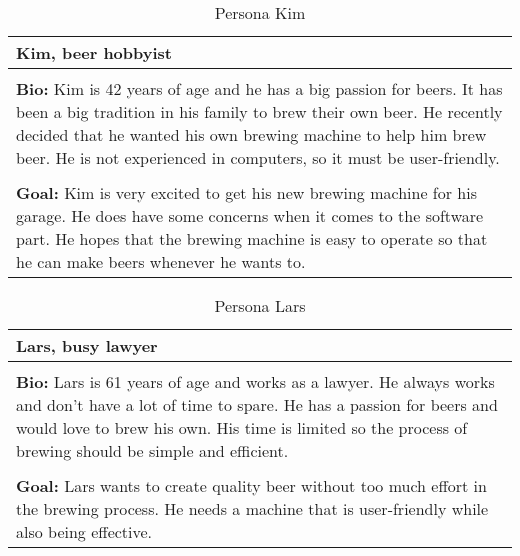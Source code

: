 \begin{table}[htb]
    \begin{center}
        \begin{tabular}{|p{16cm}|}
            \hline
            \textbf{Kim, beer hobbyist}                                                                                                                                                                                                                        \\
            \hline
            \\ \textbf{Bio:} Kim is 42 years of age and he has a big passion for beers. It has been a big tradition in his family to brew their own beer. He recently decided that he wanted his own brewing machine to help him brew beer. He is not experienced in computers, so it must be user-friendly.  \\
            \\
            \textbf{Goal:} Kim is very excited to get his new brewing machine for his garage. He does have some concerns when it comes to the software part. He hopes that the brewing machine is easy to operate so that he can make beers whenever he wants to. \\
            \hline
        \end{tabular}
        \caption{Persona Kim}
        \label{tab:persona_kim}
    \end{center}
\end{table}

\begin{table}[htb]
    \begin{center}
        \begin{tabular}{|p{16cm}|}
            \hline
            \textbf{Lars, busy lawyer}                                                                                                                                           \\
            \hline
            \\ \textbf{Bio:} Lars is 61 years of age and works as a lawyer. He always works and don't have a lot of time to spare. He has a passion for beers and would love to brew his own. His time is limited so the process of brewing should be simple and efficient.  \\
            \\
            \textbf{Goal:} Lars wants to create quality beer without too much effort in the brewing process. He needs a machine that is user-friendly while also being effective. \\
            \hline
        \end{tabular}
        \caption{Persona Lars}
        \label{tab:persona_lars}
    \end{center}
\end{table}

